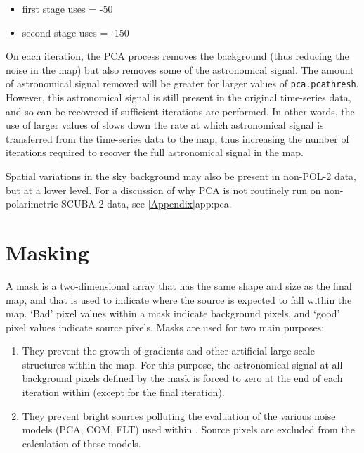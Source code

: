 \begin{itemize}
\item first stage uses  = -50
\item second stage uses  = -150
\end{itemize}

On each  iteration, the PCA process removes the background (thus
reducing the noise in the map) but also removes some of the astronomical
signal. The amount of astronomical signal removed will be greater for
larger values of \texttt{pca.pcathresh}. However, this astronomical
signal is still present in the original time-series data, and so can be
recovered if sufficient  iterations are performed. In other words,
the use of larger values of  slows down the rate at
which astronomical signal is transferred from the time-series data to the
map, thus increasing the number of iterations required to recover the
full astronomical signal in the map.

Spatial variations in the sky background may also be present in non-POL-2
data, but at a lower level. For a discussion of why PCA is not routinely
run on non-polarimetric SCUBA-2 data, see \cref{Appendix}{app:pca}{}.



\section{Masking}
A mask is a two-dimensional array that has the same shape and size as
the final map, and that is used to indicate where the source is
expected to fall within the map. `Bad' pixel values within a mask
indicate background pixels, and `good' pixel values indicate source
pixels. Masks are used for two main purposes:

\begin{enumerate}
\item They prevent the growth of gradients and other artificial large
  scale structures within the map.  For this purpose, the astronomical
  signal at all background pixels defined by the mask is forced to
  zero at the end of each iteration within  (except for the
  final iteration).
\item They prevent bright sources polluting the evaluation of the
  various noise models (PCA, COM, FLT) used within . Source
  pixels are excluded from the calculation of these models.
\end{enumerate}


